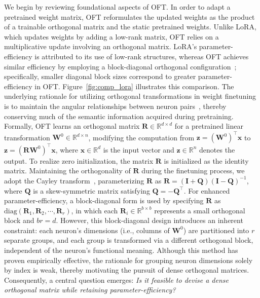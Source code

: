 We begin by reviewing foundational aspects of OFT. In order to adapt a pretrained weight matrix, OFT reformulates the updated weights as the product of a trainable orthogonal matrix and the static pretrained weights. Unlike LoRA, which updates weights by adding a low-rank matrix, OFT relies on a multiplicative update involving an orthogonal matrix. LoRA’s parameter-efficiency is attributed to its use of low-rank structures, whereas OFT achieves similar efficiency by employing a block-diagonal orthogonal configuration~\cite{qiu2023controlling}; specifically, smaller diagonal block sizes correspond to greater parameter-efficiency in OFT. Figure~\ref{fig:comp_lora} illustrates this comparison. The underlying rationale for utilizing orthogonal transformations in weight finetuning is to maintain the angular relationships between neuron pairs~\cite{liu2018learning,liu2021orthogonal,qiu2023controlling}, thereby conserving much of the semantic information acquired during pretraining. Formally, OFT learns an orthogonal matrix $\bm{R}\in\mathbb{R}^{d\times d}$ for a pretrained linear transformation $\bm{W}^0\in\mathbb{R}^{d\times n}$, modifying the computation from $\bm{z}=(\bm{W}^0)^\top\bm{x}$ to $\bm{z}=(\bm{R}\bm{W}^0)^\top\bm{x}$, where $\bm{x}\in\mathbb{R}^{d}$ is the input vector and $\bm{z}\in\mathbb{R}^{n}$ denotes the output. To realize zero initialization, the matrix $\bm{R}$ is initialized as the identity matrix. Maintaining the orthogonality of $\bm{R}$ during the finetuning process, we adopt the Cayley transform~\cite{qiu2023controlling,liu2021orthogonal}, parameterizing $\bm{R}$ as $\bm{R}=(\bm{I}+\bm{Q})(\bm{I}-\bm{Q})^{-1}$, where $\bm{Q}$ is a skew-symmetric matrix satisfying $\bm{Q}=-\bm{Q}^\top$. For enhanced parameter-efficiency, a block-diagonal form is used by specifying $\bm{R}$ as $\text{diag}(\bm{R}_1,\bm{R}_2,\cdots,\bm{R}_r)$, in which each $\bm{R}_i\in\mathbb{R}^{b\times b}$ represents a small orthogonal block and $br=d$. However, this block-diagonal design introduces an inherent constraint: each neuron's dimensions (i.e., columns of $\bm{W}^0$) are partitioned into $r$ separate groups, and each group is transformed via a different orthogonal block, independent of the neuron's functional meaning. Although this method has proven empirically effective, the rationale for grouping neuron dimensions solely by index is weak, thereby motivating the pursuit of dense orthogonal matrices. Consequently, a central question emerges: \emph{Is it feasible to devise a dense orthogonal matrix while retaining parameter-efficiency?}

